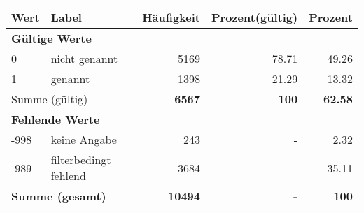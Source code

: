      \begin{longtable}{lXrrr}
     \toprule
     \textbf{Wert} & \textbf{Label} & \textbf{Häufigkeit} & \textbf{Prozent(gültig)} & \textbf{Prozent} \\
     \endhead
     \midrule
     \multicolumn{5}{l}{\textbf{Gültige Werte}}\\

     0 &
     \multicolumn{1}{X}{ nicht genannt   } &


       \num{5169} &
       \num[round-mode=places,round-precision=2]{78.71} &
         \num[round-mode=places,round-precision=2]{49.26} \\

     1 &
     \multicolumn{1}{X}{ genannt   } &


       \num{1398} &
       \num[round-mode=places,round-precision=2]{21.29} &
         \num[round-mode=places,round-precision=2]{13.32} \\
     \midrule
     \multicolumn{2}{l}{Summe (gültig)} &
       \textbf{\num{6567}} &
     \textbf{\num{100}} &
       \textbf{\num[round-mode=places,round-precision=2]{62.58}} \\
     \multicolumn{5}{l}{\textbf{Fehlende Werte}}\\
       -998 &
       keine Angabe &
         \num{243} &
        - &
         \num[round-mode=places,round-precision=2]{2.32} \\
       -989 &
       filterbedingt fehlend &
         \num{3684} &
        - &
         \num[round-mode=places,round-precision=2]{35.11} \\
     \midrule
     \multicolumn{2}{l}{\textbf{Summe (gesamt)}} &
          \textbf{\num{10494}} &
        \textbf{-} &
        \textbf{\num{100}} \\
     \bottomrule
     \end{longtable}
     
